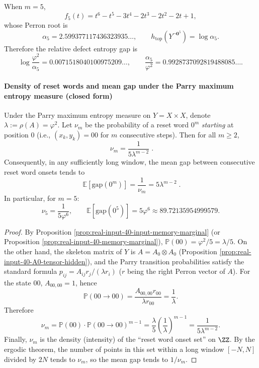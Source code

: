 \begin{corollary}[Synchronization defect entropy constant \texorpdfstring{$\alpha_5$}{alpha\_5} for \texorpdfstring{$m=5$}{m=5}]\label{cor:real-input-defect-entropy-m5}
When $m=5$,
\[
f_5(t)=t^6-t^5-3t^4-2t^3-2t^2-2t+1,
\]
whose Perron root is
\[
\alpha_5=2.599377117436323935\ldots,
\qquad
h_{\mathrm{top}}\!\left(Y^{\neg \mathbf{0}^5}\right)=\log\alpha_5.
\]
Therefore the relative defect entropy gap is
\[
\log\frac{\varphi^2}{\alpha_5}=0.0071518040100975209\ldots,
\qquad
\frac{\alpha_5}{\varphi^2}=0.9928737092819488085\ldots.
\]
\end{corollary}

\paragraph{Density of reset words and mean gap under the Parry maximum entropy measure (closed form)}
\begin{proposition}\label{prop:real-input-reset-gap}
Under the Parry maximum entropy measure on $Y=X\times X$, denote $\lambda:=\rho(A)=\varphi^2$.
Let $\nu_m$ be the probability of a reset word $0^m$ \emph{starting} at position $0$ (i.e., $(x_k,y_k)=00$ for $m$ consecutive steps). Then for all $m\ge 2$,
\[
\boxed{\;
\nu_m=\frac{1}{5\lambda^{m-2}}\; }.
\]
Consequently, in any sufficiently long window, the mean gap between consecutive reset word onsets tends to
\[
\boxed{\;
\mathbb{E}[\mathrm{gap}(0^m)]=\frac{1}{\nu_m}=5\lambda^{m-2}\; }.
\]
In particular, for $m=5$:
\[
\nu_5=\frac{1}{5\varphi^6},
\qquad
\mathbb{E}[\mathrm{gap}(0^5)]=5\varphi^6\approx 89.72135954999579.
\]
\end{proposition}
\begin{proof}
By Proposition \ref{prop:real-input-40-input-memory-marginal} (or Proposition \ref{prop:real-input-40-memory-marginal}),
\(
\mathbb{P}(00)=\varphi^2/5=\lambda/5
\).
On the other hand, the skeleton matrix of $Y$ is $A=A_0\otimes A_0$ (Proposition \ref{prop:real-input-40-A0-tensor-hidden}), and the Parry transition probabilities satisfy the standard formula
\(
p_{ij}=A_{ij}r_j/(\lambda r_i)
\)
($r$ being the right Perron vector of $A$).
For the state $00$, $A_{00,00}=1$, hence
\[
\mathbb{P}(00\to 00)=\frac{A_{00,00}r_{00}}{\lambda r_{00}}=\frac{1}{\lambda}.
\]
Therefore
\[
\nu_m
=\mathbb{P}(00)\cdot \mathbb{P}(00\to 00)^{m-1}
=\frac{\lambda}{5}\left(\frac{1}{\lambda}\right)^{m-1}
=\frac{1}{5\lambda^{m-2}}.
\]
Finally, $\nu_m$ is the density (intensity) of the ``reset word onset set'' on $\ZZ$. By the ergodic theorem, the number of points in this set within a long window $[-N,N]$ divided by $2N$ tends to $\nu_m$, so the mean gap tends to $1/\nu_m$.
\end{proof}
